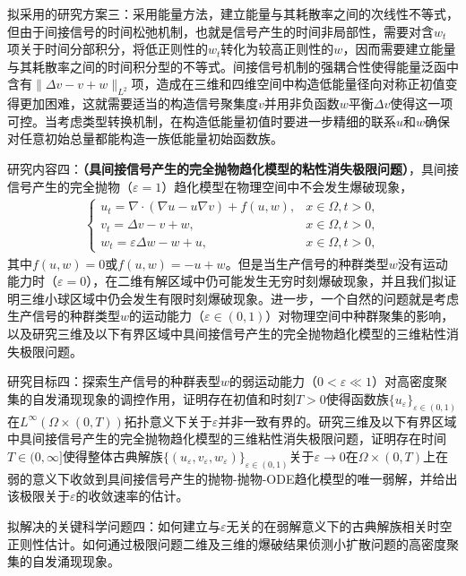 \documentclass[12pt]{article}
\begin{document}
拟采用的研究方案三：采用能量方法，建立能量与其耗散率之间的次线性不等式，但由于间接信号的时间松弛机制，也就是信号产生的时间非局部性，需要对含$w_t$项关于时间分部积分，将低正则性的$w_t$转化为较高正则性的$w$，因而需要建立能量与其耗散率之间的时间积分型的不等式。间接信号机制的强耦合性使得能量泛函中含有$\|\Delta v-v+w\|_{L^2}$项，造成在三维和四维空间中构造低能量径向对称正初值变得更加困难，这就需要适当的构造信号聚集度$v$并用非负函数$w$平衡$\Delta v$使得这一项可控。当考虑类型转换机制，在构造低能量初值时要进一步精细的联系$u$和$w$确保对任意初始总量都能构造一族低能量初始函数族。

研究内容四：\textbf{（具间接信号产生的完全抛物趋化模型的粘性消失极限问题）}，具间接信号产生的完全抛物（$\varepsilon=1$）趋化模型在物理空间中不会发生爆破现象，
\begin{align}
    \begin{cases}
      \label{sys: ks isp ppviscosity}
        u_t =  \nabla\cdot(\nabla u - u\nabla v) + f(u,w),& x\in\Omega, t>0,\\
        v_t =  \Delta v - v + w,& x\in\Omega,	 t>0,\\
        w_t  = \varepsilon \Delta w - w + u, & x\in\Omega, t > 0, 
    \end{cases}
\end{align}
其中$f(u,w)=0$或$f(u,w)=-u+w$。但是当生产信号的种群类型$w$没有运动能力时（$\varepsilon=0$），在二维有解区域中仍可能发生无穷时刻爆破现象，并且我们拟证明三维小球区域中仍会发生有限时刻爆破现象。进一步，一个自然的问题就是考虑生产信号的种群类型$w$的运动能力（$\varepsilon\in(0,1)$）对物理空间中种群聚集的影响，以及研究三维及以下有界区域中具间接信号产生的完全抛物趋化模型的三维粘性消失极限问题。

研究目标四：探索生产信号的种群表型$w$的弱运动能力（$0<\varepsilon\ll 1$）对高密度聚集的自发涌现现象的调控作用，证明存在初值和时刻$T>0$使得函数族$\{u_\varepsilon\}_{\varepsilon\in(0,1)}$在$L^\infty(\Omega\times(0,T))$拓扑意义下关于$\varepsilon$并非一致有界的。研究三维及以下有界区域中具间接信号产生的完全抛物趋化模型的三维粘性消失极限问题，证明存在时间$T\in(0,\infty]$使得整体古典解族$\{(u_\varepsilon,v_\varepsilon,w_\varepsilon)\}_{\varepsilon\in(0,1)}$关于$\varepsilon\to0$在$\Omega\times(0,T)$上在弱的意义下收敛到具间接信号产生的抛物-抛物-ODE趋化模型的唯一弱解，并给出该极限关于$\varepsilon$的收敛速率的估计。

拟解决的关键科学问题四：如何建立与$\varepsilon$无关的在弱解意义下的古典解族相关时空正则性估计。如何通过极限问题二维及三维的爆破结果侦测小扩散问题的高密度聚集的自发涌现现象。
\end{document}
